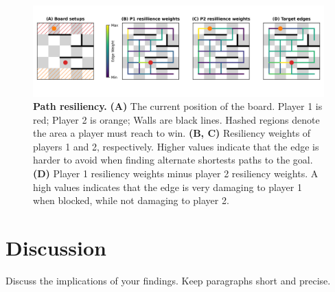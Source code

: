 \documentclass[10pt]{article}
\begin{document}
\begin{figure}[H]
    \centering
    \includegraphics[width=\linewidth]{path_figure.png}
    \caption{\textbf{Path resiliency.} \textbf{(A)} The current position of the board. Player 1 is red; Player 2 is orange; Walls are black lines. Hashed regions denote the area a player must reach to win. \textbf{(B, C)} Resiliency weights of players 1 and 2, respectively. Higher values indicate that the edge is harder to avoid when finding alternate shortests paths to the goal. \textbf{(D)} Player 1 resiliency weights minus player 2 resiliency weights. A high values indicates that the edge is very damaging to player 1 when blocked, while not damaging to player 2.}
    \label{fig:sample}
\end{figure}

\section{Discussion}
Discuss the implications of your findings. Keep paragraphs short and precise.




\end{document}
